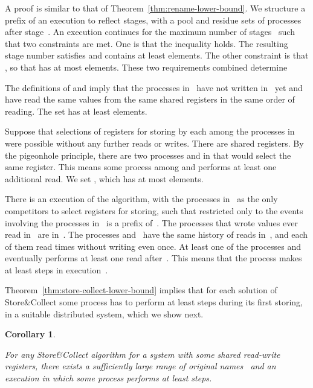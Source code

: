 \documentclass[11pt]{article}
\newcommand{\qed}{\hfill  \smallbreak}
\newenvironment{proof}{\noindent{\bf Proof:}}{\qed}
\newtheorem{corollary}{Corollary}
\begin{document}
\begin{proof} 
A proof  is similar to that of Theorem~\ref{thm:rename-lower-bound}.
We structure a prefix of an execution  to reflect stages, with a pool  and residue  sets of processes after stage~.
An execution continues for the maximum number of stages~  such that two constraints are met.
One is that the inequality  holds.
The resulting stage number  satisfies  and  contains at least  elements.
The other constraint is that , so that  has at most  elements. 
These two requirements combined determine 

The definitions of  and  imply that the processes in~  have not written in~ yet  and have read the same values from the same shared registers in the same order of reading.
The set  has at least  elements.

Suppose that selections of registers for storing by each among the processes in  were possible without any further reads or writes.
There are  shared registers.
By the pigeonhole principle, there are two processes  and  in  that would select the same register.
This means some process among  and  performs at least one additional read.
We set , which has at most  elements.

There is an execution  of the algorithm, with the processes in~ as the only competitors to select registers for storing, such that  restricted only to the events involving the processes in~ is a prefix of~.
The processes that wrote values ever read in~ are in~.
The processes  and~ have the same history of reads  in~, and each of them read  times without writing even once.
At least one of the processes  and  eventually performs at least one read  after~.
This means that the process makes at least  steps in execution~.
\end{proof}

Theorem~\ref{thm:store-collect-lower-bound} implies that for each solution of Store\&Collect some process has to perform at least  steps during its first storing, in a suitable distributed system, which we show next.



\begin{corollary}
\label{cor:storing-lower-bound-k-steps}

For any Store\&Collect algorithm for a system with some  shared read-write registers, there exists a sufficiently large range of original names~ and an execution in which some process performs at least  steps.
\end{corollary}
\end{document}
